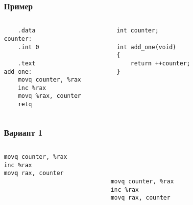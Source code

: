 \begin{frame}[fragile]
\frametitle{Пример}
    \begin{columns}
        \begin{column}{.4\textwidth}
            \begin{lstlisting}
    .data
counter:
    .int 0

    .text
add_one:
    movq counter, %rax
    inc %rax
    movq %rax, counter
    retq
            \end{lstlisting}
        \end{column}
        \begin{column}{.4\textwidth}
            \begin{lstlisting}
int counter;

int add_one(void)
{
    return ++counter;
}	
            \end{lstlisting}
        \end{column}
        \begin{column}{.2\textwidth}
        \end{column}
    \end{columns}
\end{frame}

\begin{frame}[fragile]
\frametitle{Вариант 1}
\begin{columns}
    \begin{column}{.35\textwidth}
        \begin{lstlisting}
movq counter, %rax
inc %rax
movq rax, counter
 
 
 
        \end{lstlisting}
    \end{column}
    \begin{column}{.35\textwidth}
        \begin{lstlisting}
 
 
 
movq counter, %rax
inc %rax
movq rax, counter
        \end{lstlisting}
    \end{column}
    \begin{column}{.3\textwidth}
    \end{column}
\end{columns}
\end{frame}

